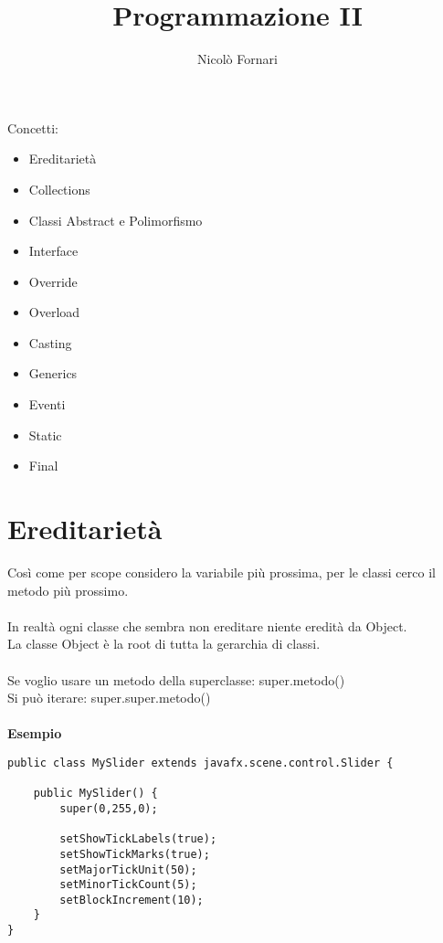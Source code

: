 \documentclass[10pt,a4paper]{article}
\title{Programmazione II}
\author{Nicolò Fornari}
\begin{document}
\maketitle
Concetti:
\begin{itemize}
 \setlength\itemsep{0em}
\item Ereditarietà
\item Collections
\item Classi Abstract e Polimorfismo
\item Interface
\item Override
\item Overload
\item Casting
\item Generics
\item Eventi
\item Static
\item Final
\end{itemize}
\newpage
\section{Ereditarietà}
Così come per scope considero la variabile più prossima, per le classi cerco il metodo più prossimo.\\\\
In realtà ogni classe che sembra non ereditare niente eredità da Object.\\
La classe Object è la root di tutta la gerarchia di classi.\\\\
Se voglio usare un metodo della superclasse: super.metodo()\\
Si può iterare: super.super.metodo()\\\\
\textbf{Esempio}\\
\begin{verbatim}
public class MySlider extends javafx.scene.control.Slider {
    
    public MySlider() {
        super(0,255,0);
    
        setShowTickLabels(true);
        setShowTickMarks(true);
        setMajorTickUnit(50);
        setMinorTickCount(5);
        setBlockIncrement(10);
    }
}
\end{verbatim}
\newpage
\end{document}
